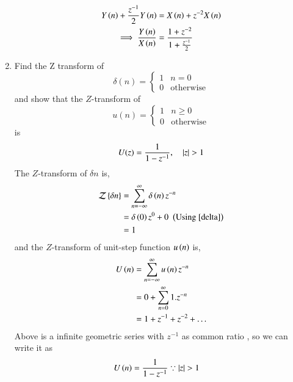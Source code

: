 \documentclass[journal,12pt,twocolumn]{IEEEtran}
\renewcommand\thesection{\arabic{section}}
\begin{document}
\begin{enumerate}[label=\thesection.\arabic*]
      \begin{align}
          Y\left(n\right) + \frac{z^{-1}}{2}Y\left(n\right) &= X\left(n\right) + z^{-2}X\left(n\right)\\
       \implies \frac{Y\left(n\right)}{X\left(n\right)} &= \frac{1 + z^{-2}}{1 + \frac{z^{-1}}{2}} 
      \end{align}       
      \item Find the Z transform of 
      \begin{equation}
      \label{delta}
      \delta(n)
      =
      \begin{cases}
      1 & n = 0
      \\
      0 & \text{otherwise}
      \end{cases}
      \end{equation}
      and show that the $Z$-transform of
      \begin{equation}
      \label{eq:unit_step}
      u(n)
      =
      \begin{cases}
      1 & n \ge 0
      \\
      0 & \text{otherwise}
      \end{cases}
      \end{equation}
      is
      \begin{equation}
      U(z) = \frac{1}{1-z^{-1}}, \quad \left\vert z\right\vert > 1
      \end{equation}
      \solution 
      The $Z$-transform of $\delta{n}$ is,
      \begin{align}
          \mathcal{Z}\left\{\delta{n}\right\} &= \sum_{n=-\infty}^{\infty}\delta\left(n\right)z^{-n}\\
                                       &= \delta\left(0\right)z^{0} + 0\,\, \left(\text{Using \eqref{delta}}\right)\\
                                       &= 1
      \end{align}
       and the $Z$-transform of unit-step function $u\left(n\right)$ is,
      \begin{align}
          U\left(n\right) &= \sum_{n=-\infty}^{\infty}u\left(n\right)z^{-n}\\
                    &= 0 + \sum_{n = 0}^{\infty}1.z^{-n}\\
                    &= 1 + z^{-1} + z^{-2} + .\,.\,.
      \end{align}
       Above is a infinite geometric series with $z^{-1}$ as common ratio , so we can write it as 
      \begin{align}
          U\left(n\right) &= \frac{1}{1-z^{-1}} \because \left\vert z\right\vert > 1
      \end{align} 

\end{enumerate}
\end{document}
